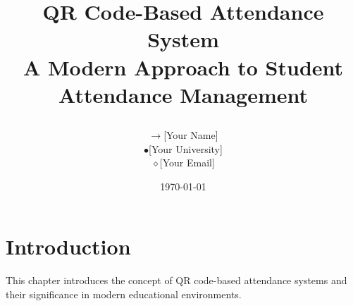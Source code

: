 \documentclass[12pt,a4paper]{report}
\title{%
    \begin{tcolorbox}[
        base,
        width=\textwidth,
        colback=ChapterPurple!10,
        colframe=ChapterPurple
    ]
    \centering
    \Huge\textcolor{ChapterPurple}{QR Code-Based Attendance System}\\[0.5em]
    \large\textcolor{TextBlack}{A Modern Approach to Student Attendance Management}
    \end{tcolorbox}
}
\author{
    \begin{tcolorbox}[
        base,
        width=0.8\textwidth,
        colback=InfoBlue!5,
        colframe=InfoBlue
    ]
    \centering
    \textcolor{InfoBlue}{$\rightarrow$}\quad\textcolor{TextBlack}{[Your Name]}\\[0.3em]
    \textcolor{SectionTeal}{$\bullet$}\quad\textcolor{TextBlack}{[Your University]}\\[0.3em]
    \textcolor{NoteGreen}{$\diamond$}\quad\textcolor{TextBlack}{[Your Email]}
    \end{tcolorbox}
}
\date{\textcolor{TextBlack}{\today}}
\begin{document}
\maketitle
\tableofcontents

\chapter{Introduction}
\begin{infobox}
This chapter introduces the concept of QR code-based attendance systems and their significance in modern educational environments.
\end{infobox}




\begin{notebox}
\end{notebox}

\begin{warningbox}
\end{warningbox}

\end{document}
